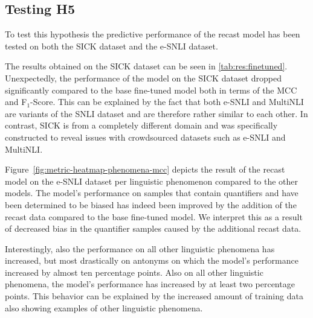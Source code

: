 \subsection{Testing H5}
To test this hypothesis the predictive performance of the recast model has been tested on both the \ac{SICK} dataset and the \ac{e-SNLI} dataset.

The results obtained on the \ac{SICK} dataset can be seen in \autoref{tab:res:finetuned}. Unexpectedly, the performance of the model on the \ac{SICK} dataset dropped significantly compared to the base fine-tuned model both in terms of the \ac{MCC} and F$_1$-Score. This can be explained by the fact that both \ac{e-SNLI} and \ac{MultiNLI} are variants of the \ac{SNLI} dataset and are therefore rather similar to each other. In contrast, \ac{SICK} is from a completely different domain and was specifically constructed to reveal issues with crowdsourced datasets such as \ac{e-SNLI} and \ac{MultiNLI}.

Figure~\ref{fig:metric-heatmap-phenomena-mcc} depicts the result of the recast model on the \ac{e-SNLI} dataset per linguistic phenomenon compared to the other models. The model's performance on samples that contain quantifiers and have been determined to be biased has indeed been improved by the addition of the recast data compared to the base fine-tuned model. We interpret this as a result of decreased bias in the quantifier samples caused by the additional recast data.

Interestingly, also the performance on all other linguistic phenomena has increased, but most drastically on antonyms on which the model's performance increased by almost ten percentage points. Also on all other linguistic phenomena, the model's performance has increased by at least two percentage points. This behavior can be explained by the increased amount of training data also showing examples of other linguistic phenomena.
